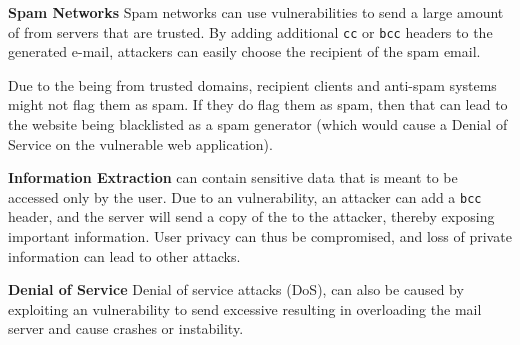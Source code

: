 \noindent\textbf{Spam Networks}
	Spam networks can use \ehi vulnerabilities to send a large amount of \email from servers that are trusted. By adding additional \lstinline{cc} or \lstinline{bcc} headers to the generated e-mail, attackers can easily choose the recipient of the spam email. 
	
	Due to the \email being from trusted domains, recipient \email clients and anti-spam systems might not flag them as spam. If they do flag them as spam, then that can lead to the website being blacklisted as a spam generator (which would cause a Denial of Service on the vulnerable web application). 
	
\noindent\textbf{Information Extraction}
	\Emails can contain sensitive data that is meant to be accessed only by the user. Due to an \ehi vulnerability, an attacker can add a \lstinline{bcc} header, and the \email server will send a copy of the \email to the attacker, thereby exposing important information.
	User privacy can thus be compromised, and loss of private information can lead to other attacks.

    \noindent\textbf{Denial of Service}
    Denial of service attacks (DoS), can also be caused by exploiting an \ehi vulnerability to send excessive \emails resulting in overloading the mail server and cause crashes or instability. 

